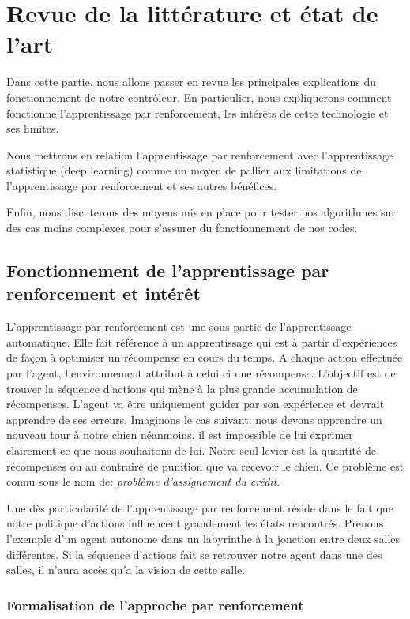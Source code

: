 \newpage
\section{Revue de la littérature et état de l'art}

Dans cette partie, nous allons passer en revue les principales explications du fonctionnement de notre contrôleur. 
En particulier, nous expliquerons comment fonctionne l'apprentissage par renforcement, les intérêts de cette technologie et ses limites.  

Nous mettrons en relation l'apprentissage par renforcement avec l'apprentissage statistique (deep learning) comme un moyen de pallier aux limitations de l'apprentissage par renforcement et ses autres bénéfices.

Enfin, nous discuterons des moyens mis en place pour tester nos algorithmes sur des cas moins complexes pour s'assurer du fonctionnement de nos codes.

\subsection{Fonctionnement de l'apprentissage par renforcement et intérêt}

L'apprentissage par renforcement est une sous partie de l'apprentissage automatique. Elle fait référence à un apprentissage qui est à partir d'expériences de façon à optimiser un récompense en cours du temps. A chaque action effectuée par l'agent, l'environnement attribut à celui ci une récompense. L'objectif est de trouver la séquence d'actions qui mène à la plus grande accumulation de récompenses. L'agent va être uniquement guider par son expérience et devrait apprendre de ses erreurs. Imaginons le cas suivant: nous devons apprendre un nouveau tour à notre chien néanmoins, il est impossible de lui exprimer clairement ce que nous souhaitons de lui. Notre seul levier est la quantité de récompenses ou au contraire de punition que va recevoir le chien. Ce problème est connu sous le nom de: \emph{problème d'assignement du crédit}. 

Une dès particularité de l'apprentissage par renforcement réside dans le fait que notre politique d'actions influencent grandement les états rencontrés. Prenons l'exemple d'un agent autonome dans un labyrinthe à la jonction entre deux salles différentes. Si la séquence d'actions fait se retrouver notre agent dans une des salles, il n'aura accès qu'a la vision de cette salle.

\subsubsection{Formalisation de l'approche par renforcement}

